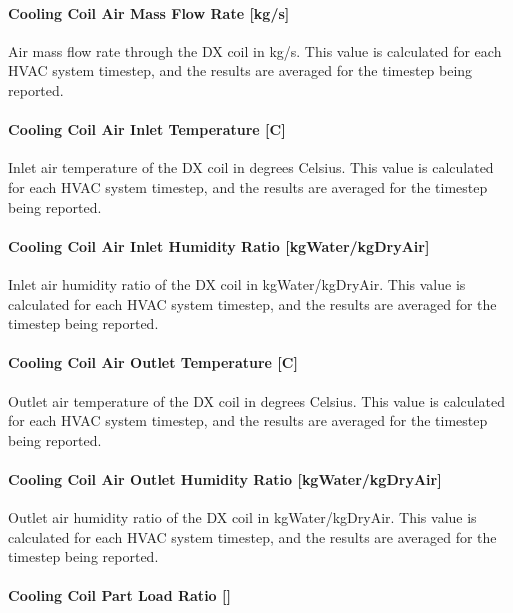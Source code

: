 \paragraph{Cooling Coil Air Mass Flow Rate {[}kg/s{]}}

Air mass flow rate through the DX coil in kg/s. This value is calculated for each HVAC system timestep, and the results are averaged for the timestep being reported.

\paragraph{Cooling Coil Air Inlet Temperature {[}C{]}}

Inlet air temperature of the DX coil in degrees Celsius. This value is calculated for each HVAC system timestep, and the results are averaged for the timestep being reported.

\paragraph{Cooling Coil Air Inlet Humidity Ratio {[}kgWater/kgDryAir{]}}

Inlet air humidity ratio of the DX coil in kgWater/kgDryAir. This value is calculated for each HVAC system timestep, and the results are averaged for the timestep being reported.

\paragraph{Cooling Coil Air Outlet Temperature {[}C{]}}

Outlet air temperature of the DX coil in degrees Celsius. This value is calculated for each HVAC system timestep, and the results are averaged for the timestep being reported.

\paragraph{Cooling Coil Air Outlet Humidity Ratio {[}kgWater/kgDryAir{]}}

Outlet air humidity ratio of the DX coil in kgWater/kgDryAir. This value is calculated for each HVAC system timestep, and the results are averaged for the timestep being reported.

\paragraph{Cooling Coil Part Load Ratio {[]}}

